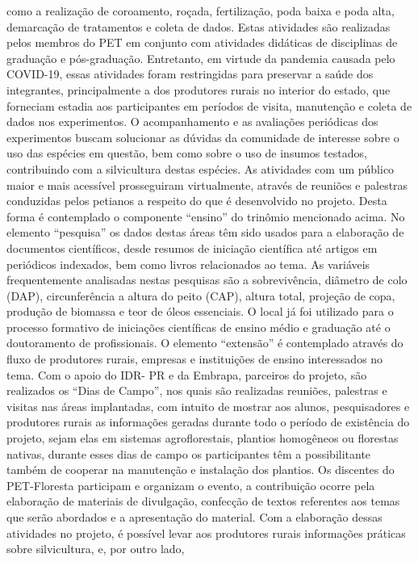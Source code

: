 como a realização de coroamento, roçada, fertilização, poda baixa e poda alta, demarcação de
tratamentos e coleta de dados. Estas atividades são realizadas pelos membros do PET em
conjunto com atividades didáticas de disciplinas de graduação e pós-graduação. Entretanto, em
virtude da pandemia causada pelo COVID-19, essas atividades foram restringidas para preservar
a saúde dos integrantes, principalmente a dos produtores rurais no interior do estado, que
forneciam estadia aos participantes em períodos de visita, manutenção e coleta de dados nos
experimentos. O acompanhamento e as avaliações periódicas dos experimentos buscam
solucionar as dúvidas da comunidade de interesse sobre o uso das espécies em questão, bem
como sobre o uso de insumos testados, contribuindo com a silvicultura destas espécies. As
atividades com um público maior e mais acessível prosseguiram virtualmente, através de
reuniões e palestras conduzidas pelos petianos a respeito do que é desenvolvido no projeto. Desta
forma é contemplado o componente “ensino” do trinômio mencionado acima. No elemento
“pesquisa” os dados destas áreas têm sido usados para a elaboração de documentos científicos,
desde resumos de iniciação científica até artigos em periódicos indexados, bem como livros
relacionados ao tema. As variáveis frequentemente analisadas nestas pesquisas são a
sobrevivência, diâmetro de colo (DAP), circunferência a altura do peito (CAP), altura total,
projeção de copa, produção de biomassa e teor de óleos essenciais. O local já foi utilizado para o
processo formativo de iniciações científicas de ensino médio e graduação até o doutoramento de
profissionais. O elemento “extensão” é contemplado através do fluxo de produtores rurais,
empresas e instituições de ensino interessados no tema. Com o apoio do IDR- PR e da Embrapa,
parceiros do projeto, são realizados os “Dias de Campo”, nos quais são realizadas reuniões,
palestras e visitas nas áreas implantadas, com intuito de mostrar aos alunos, pesquisadores e
produtores rurais as informações geradas durante todo o período de existência do projeto, sejam
elas em sistemas agroflorestais, plantios homogêneos ou florestas nativas, durante esses dias de
campo os participantes têm a possibilitante também de cooperar na manutenção e instalação dos
plantios. Os discentes do PET-Floresta participam e organizam o evento, a contribuição ocorre
pela elaboração de materiais de divulgação, confecção de textos referentes aos temas que serão
abordados e a apresentação do material. Com a elaboração dessas atividades no projeto, é
possível levar aos produtores rurais informações práticas sobre silvicultura, e, por outro lado,
